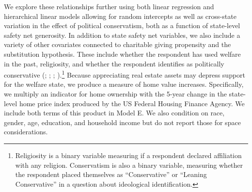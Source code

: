 \documentclass[
  11pt,
  oneside]{article}
\begin{document}
We explore these relationships further using both linear regression and hierarchical linear models allowing for random intercepts as well as cross-state variation in the effect of political conservatism, both as a function of state-level safety net generosity. In addition to state safety net variables, we also include a variety of other covariates connected to charitable giving propensity and the substitution hypothesis. These include whether the respondent has used welfare in the past, religiosity, and whether the respondent identifies as politically conservative (; ; ; ).\footnote{Religiosity is a binary variable measuring if a respondent declared affiliation with any religion. Conservatism is also a binary variable, measuring whether the respondent placed themselves as ``Conservative'' or ``Leaning Conservative'' in a question about ideological identification.} Because appreciating real estate assets may depress support for the welfare state, we produce a measure of home value increases. Specifically, we multiply an indicator for home ownership with the 5-year change in the state-level home price index produced by the US Federal Housing Finance Agency. We include both terms of this product in Model E. We also condition on race, gender, age, education, and household income but do not report those for space considerations.
\end{document}
